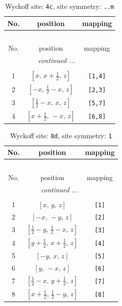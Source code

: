 \documentclass[fleqn,8pt]{jsarticle}
\begin{document}
\begin{longtable}{ccc}
\caption{Wyckoff site: {\tt 4c}, site symmetry: {\tt ..m}}
 \\
 \hline \hline
No. & position & mapping \\ \hline \endfirsthead

\multicolumn{2}{l}{\tablename\ \thetable{}} \\
 \hline \hline
No. & position & mapping \\ \hline \endhead

 \hline \hline
\multicolumn{2}{r}{\footnotesize\it continued ...} \\ \endfoot

 \hline \hline
\multicolumn{2}{r}{} \\ \endlastfoot

1 & $\left[ x,\, x + \frac{1}{2},\, z \right]$ & {\tt [1,4]} \\ \hline
2 & $\left[ - x,\, \frac{1}{2} - x,\, z \right]$ & {\tt [2,3]} \\ \hline
3 & $\left[ \frac{1}{2} - x,\, x,\, z \right]$ & {\tt [5,7]} \\ \hline
4 & $\left[ x + \frac{1}{2},\, - x,\, z \right]$ & {\tt [6,8]} \\
\end{longtable}
\renewcommand{\arraystretch}{1.2}
\begin{longtable}{ccc}
\caption{Wyckoff site: {\tt 8d}, site symmetry: {\tt 1}}
 \\
 \hline \hline
No. & position & mapping \\ \hline \endfirsthead

\multicolumn{2}{l}{\tablename\ \thetable{}} \\
 \hline \hline
No. & position & mapping \\ \hline \endhead

 \hline \hline
\multicolumn{2}{r}{\footnotesize\it continued ...} \\ \endfoot

 \hline \hline
\multicolumn{2}{r}{} \\ \endlastfoot

1 & $\left[ x,\, y,\, z \right]$ & {\tt [1]} \\ \hline
2 & $\left[ - x,\, - y,\, z \right]$ & {\tt [2]} \\ \hline
3 & $\left[ \frac{1}{2} - y,\, \frac{1}{2} - x,\, z \right]$ & {\tt [3]} \\ \hline
4 & $\left[ y + \frac{1}{2},\, x + \frac{1}{2},\, z \right]$ & {\tt [4]} \\ \hline
5 & $\left[ - y,\, x,\, z \right]$ & {\tt [5]} \\ \hline
6 & $\left[ y,\, - x,\, z \right]$ & {\tt [6]} \\ \hline
7 & $\left[ \frac{1}{2} - x,\, y + \frac{1}{2},\, z \right]$ & {\tt [7]} \\ \hline
8 & $\left[ x + \frac{1}{2},\, \frac{1}{2} - y,\, z \right]$ & {\tt [8]} \\
\end{longtable}
\end{document}
